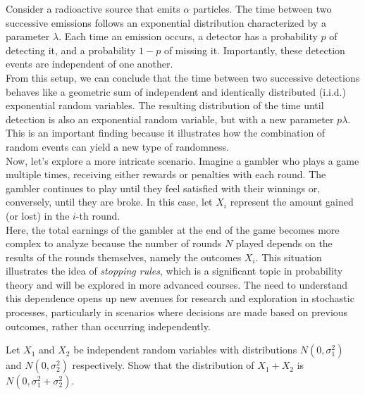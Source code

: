 Consider a radioactive source that emits \(\alpha\) particles. The time between two successive emissions follows an exponential distribution characterized by a parameter \(\lambda\). Each time an emission occurs, a detector has a probability \(p\) of detecting it, and a probability \(1 - p\) of missing it. Importantly, these detection events are independent of one another.\\

From this setup, we can conclude that the time between two successive detections behaves like a geometric sum of independent and identically distributed (i.i.d.) exponential random variables. The resulting distribution of the time until detection is also an exponential random variable, but with a new parameter \(p\lambda\). This is an important finding because it illustrates how the combination of random events can yield a new type of randomness.\\

Now, let’s explore a more intricate scenario. Imagine a gambler who plays a game multiple times, receiving either rewards or penalties with each round. The gambler continues to play until they feel satisfied with their winnings or, conversely, until they are broke. In this case, let \(X_i\) represent the amount gained (or lost) in the \(i\)-th round.\\

Here, the total earnings of the gambler at the end of the game becomes more complex to analyze because the number of rounds \(N\) played depends on the results of the rounds themselves, namely the outcomes \(X_i\). This situation illustrates the idea of \textit{stopping rules}, which is a significant topic in probability theory and will be explored in more advanced courses. The need to understand this dependence opens up new avenues for research and exploration in stochastic processes, particularly in scenarios where decisions are made based on previous outcomes, rather than occurring independently.

\begin{exercise}
Let \( X_1 \) and \( X_2 \) be independent random variables with distributions \( N(0, \sigma_1^2) \) and \( N(0, \sigma_2^2) \) respectively. Show that the distribution of \( X_1 + X_2 \) is \( N(0, \sigma_1^2 + \sigma_2^2) \).
\end{exercise}

